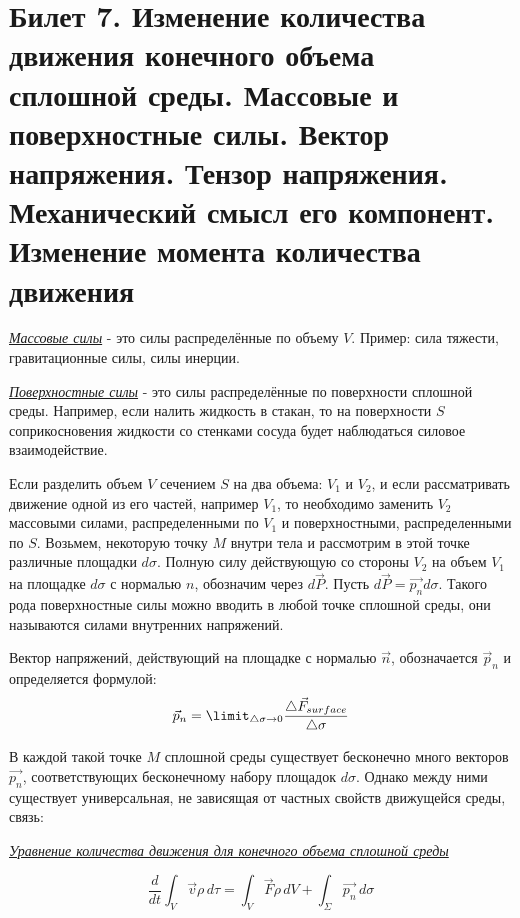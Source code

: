\newpage
\section{Билет 7. Изменение количества движения конечного объема сплошной среды. Массовые и поверхностные силы. Вектор напряжения. Тензор напряжения. Механический смысл его компонент. Изменение момента количества движения}

\textit{\underline{Массовые силы}} - это силы распределённые по объему $V$. Пример: сила тяжести, гравитационные силы, силы инерции.

\textit{\underline{Поверхностные силы}} - это силы распределённые по поверхности сплошной среды. Например, если налить жидкость в стакан, то на поверхности $S$ соприкосновения жидкости со стенками сосуда будет наблюдаться силовое взаимодействие.

Если разделить объем $V$ сечением $S$ на два объема: $V_1$ и $V_2$, и если рассматривать движение одной из его частей, например $V_1$, то необходимо заменить $V_2$ массовыми силами, распределенными по $V_1$ и поверхностными, распределенными по $S$. Возьмем, некоторую точку $M$ внутри тела и рассмотрим в этой точке различные площадки $d\sigma$. Полную силу действующую со стороны $V_2$ на объем $V_1$ на площадке $d\sigma$ с нормалью $n$, обозначим через $d\vec{P}$. Пусть $d\vec{P} = \vec{p_n}d\sigma$. Такого рода поверхностные силы можно вводить в любой точке сплошной среды, они называются силами внутренних напряжений. 

Вектор напряжений, действующий на площадке с нормалью $\vec{n}$, обозначается $\vec{p}_n$ и определяется формулой: $$\vec{p}_n = \limit_{\triangle \sigma \rightarrow 0} \frac{\triangle \vec{F}_{surface}}{\triangle \sigma}$$

В каждой такой точке $M$ сплошной среды существует бесконечно много векторов $\vec{p_n}$, соответствующих бесконечному набору площадок $d\sigma$. Однако между ними существует универсальная, не зависящая от частных свойств движущейся среды, связь:

\begin{center}
    \textit{\underline{Уравнение количества движения для конечного объема сплошной среды}}
\end{center}
$$
\frac{d}{dt}  \int_{V} \vec{v} \rho \,d\tau =  \int_{V} \vec{F} \rho \,dV  + \int_{\Sigma} \vec{p_n} \,d\sigma
$$

